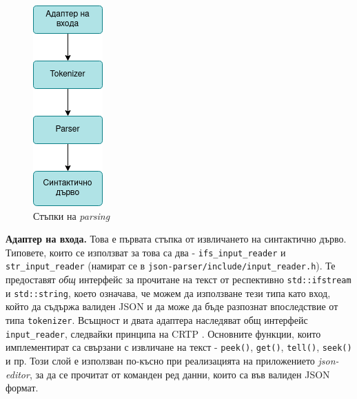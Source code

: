\documentclass[10pt]{article}
\begin{document}
\begin{figure}
\centering
\includegraphics[width=.5\linewidth]{parsing_steps.png}
\caption{Стъпки на \textit{parsing}}
\label{fig:parsing_steps}
\end{figure}

\par
\textbf{Адаптер на входа.} Това е първата стъпка от извличането на синтактично дърво. Типовете, които се използват за това са два - \verb|ifs_input_reader| и \verb|str_input_reader| (намират се в \verb|json-parser/include/input_reader.h|). Те предоставят \textit{общ} интерфейс за прочитане на текст от респективно \verb|std::ifstream| и \verb|std::string|, което означава, че можем да използване тези типа като вход, който да съдържа валиден JSON и да може да бъде разпознат впоследствие от типа \verb|tokenizer|. Всъщност и двата адаптера наследяват общ интерфейс \verb|input_reader|, следвайки принципа на CRTP \autocite{crtp}. Основните функции, които имплементират са свързани с извличане на текст - \verb|peek()|, \verb|get()|, \verb|tell()|, \verb|seek()| и пр. Този слой е използван по-късно при реализацията на приложението \textit{json-editor}, за да се прочитат от команден ред данни, които са във валиден JSON формат.
\end{document}
